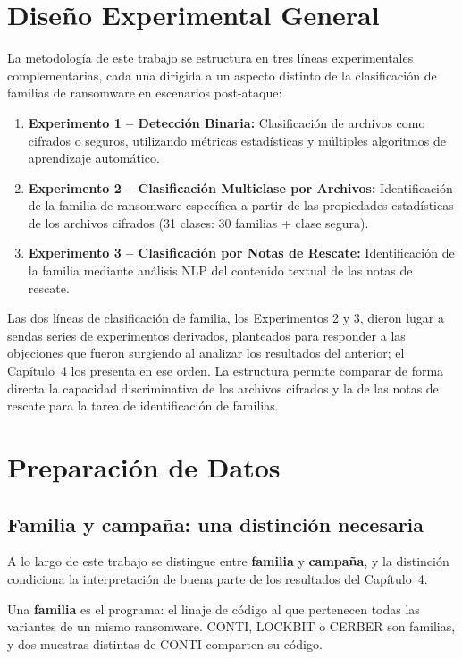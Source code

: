 \section{Diseño Experimental General}

La metodología de este trabajo se estructura en tres líneas experimentales complementarias, cada una dirigida a un aspecto distinto de la clasificación de familias de ransomware en escenarios post-ataque:

\begin{enumerate}
    \item \textbf{Experimento 1 -- Detección Binaria:} Clasificación de archivos como cifrados o seguros, utilizando métricas estadísticas y múltiples algoritmos de aprendizaje automático.
    \item \textbf{Experimento 2 -- Clasificación Multiclase por Archivos:} Identificación de la familia de ransomware específica a partir de las propiedades estadísticas de los archivos cifrados (31 clases: 30 familias + clase segura).
    \item \textbf{Experimento 3 -- Clasificación por Notas de Rescate:} Identificación de la familia mediante análisis NLP del contenido textual de las notas de rescate.
\end{enumerate}

Las dos líneas de clasificación de familia, los Experimentos 2 y 3, dieron lugar a sendas series de experimentos derivados, planteados para responder a las objeciones que fueron surgiendo al analizar los resultados del anterior; el Capítulo~4 los presenta en ese orden. La estructura permite comparar de forma directa la capacidad discriminativa de los archivos cifrados y la de las notas de rescate para la tarea de identificación de familias.

\section{Preparación de Datos}

\subsection{Familia y campaña: una distinción necesaria}
\label{subsec:met_campana}

A lo largo de este trabajo se distingue entre \textbf{familia} y \textbf{campaña}, y la distinción condiciona la interpretación de buena parte de los resultados del Capítulo~4.

Una \textbf{familia} es el programa: el linaje de código al que pertenecen todas las variantes de un mismo ransomware. CONTI, LOCKBIT o CERBER son familias, y dos muestras distintas de CONTI comparten su código.

